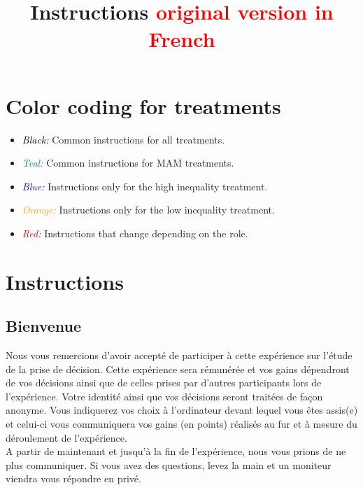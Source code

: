 \documentclass[12pt]{article}
\begin{document}
\title{Instructions \textcolor{red}{original version in French}}
\maketitle

 \section{Color coding for treatments}
 \begin{itemize}
     \item \textcolor{black}{\textit{Black:}} Common instructions for all treatments.
     
     \item \textcolor{teal}{\textit{Teal:}} Common instructions for MAM treatments.
     \item \textcolor{blue}{\textit{Blue:}} Instructions only for the high inequality treatment.
     \item \textcolor{orange}{\textit{Orange:}} Instructions only for the low inequality treatment.
     \item \textcolor{red}{\textit{Red:}} Instructions that change depending on the role.
 \end{itemize}
 \newpage

 \section{Instructions}

\subsection*{Bienvenue}

\noindent Nous vous remercions d’avoir accepté de participer à cette expérience sur l’étude de la prise de décision. Cette expérience sera rémunérée et vos gains dépendront de vos décisions ainsi que de celles prises par d’autres participants lors de l’expérience. Votre identité ainsi que vos décisions seront traitées de façon anonyme. Vous indiquerez vos choix à l'ordinateur devant lequel vous êtes assis(e) et celui-ci vous communiquera vos gains (en points) réalisés au fur et à mesure du déroulement de l'expérience. \\

\noindent A partir de maintenant et jusqu'à la fin de l’expérience, nous vous prions de ne plus communiquer. Si vous avez des questions, levez la main et un moniteur viendra vous répondre en privé.
\end{document}
